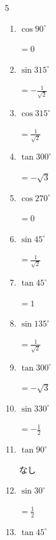 \newpage
\resetdrill

\begin{multicols}{5}
\begin{enumerate}
  \itemsep=7pt
  \item $\displaystyle \cos{90^\circ}$

        $\displaystyle =0$

  \item $\displaystyle \sin{315^\circ}$

        $\displaystyle =-\frac{1}{\sqrt{2}}$

  \item $\displaystyle \cos{315^\circ}$

        $\displaystyle =\frac{1}{\sqrt{2}}$

  \item $\displaystyle \tan{300^\circ}$

        $\displaystyle =-\sqrt{3}$

  \item $\displaystyle \cos{270^\circ}$

        $\displaystyle =0$

  \item $\displaystyle \sin{45^\circ}$

        $\displaystyle =\frac{1}{\sqrt{2}}$

  \item $\displaystyle \tan{45^\circ}$

        $\displaystyle =1$

  \item $\displaystyle \sin{135^\circ}$

        $\displaystyle =\frac{1}{\sqrt{2}}$

  \item $\displaystyle \tan{300^\circ}$

        $\displaystyle =-\sqrt{3}$

  \item $\displaystyle \sin{330^\circ}$

        $\displaystyle =-\frac{1}{2}$

  \item $\displaystyle \tan{90^\circ}$

        $\displaystyle なし$

  \item $\displaystyle \sin{30^\circ}$

        $\displaystyle =\frac{1}{2}$

  \item $\displaystyle \tan{45^\circ}$


\end{enumerate}
\end{multicols}
